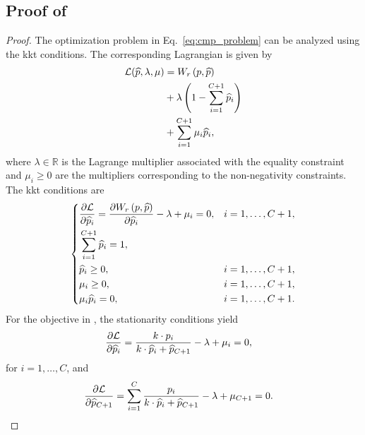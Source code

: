 \subsection{Proof of }
\label{sec:proof_kkt_conditions}
\theoremKKT*
\begin{proof}
    The optimization problem in Eq.~\eqref{eq:cmp_problem} can be analyzed using the \gls*{kkt} conditions. The corresponding Lagrangian is given by
    \begin{align*}
        \mathcal{L}(\phat, \lambda, \mu) & = \W{r} \\ & +\lambda\left(1-\sum_{i=1}^{C+1}\phat_i\right) \\ & +\sum_{i=1}^{C+1}\mu_i\phat_i,
    \end{align*}
    where $\lambda\in\mathbb{R}$ is the Lagrange multiplier associated with the equality constraint and $\mu_i\ge0$ are the multipliers corresponding to the non-negativity constraints.
    The \gls*{kkt} conditions are
    \begin{align*}
        \left\{
        \begin{aligned}
             & \frac{\partial \mathcal{L}}{\partial \phat_i}
            = \frac{\partial \W{r}}{\partial \phat_i}
            - \lambda + \mu_i = 0,
             &                                               & i=1,\ldots,C+1, \\
             & \sum_{i=1}^{C+1} \phat_i = 1,                                   \\
             & \phat_i                   \ge 0,
             &                                               & i=1,\ldots,C+1, \\
             & \mu_i                       \ge 0,
             &                                               & i=1,\ldots,C+1, \\
             & \mu_i \phat_i             = 0,
             &                                               & i=1,\ldots,C+1.
        \end{aligned}
        \right.
    \end{align*}
    For the objective in , the stationarity conditions yield
    \begin{align*}
        \frac{\partial\mathcal{L}}{\partial\widehat{p}_i} & = \frac{k\cdot p_i}{k\cdot\widehat{p}_i+\widehat{p}_{C+1}}-\lambda+\mu_i = 0,
    \end{align*}
    for \(i = 1, \ldots, C\), and
    \begin{align*}
        \frac{\partial\mathcal{L}}{\partial\phat_{C+1}} & = \sum_{i=1}^{C}\frac{p_i}{\costmult\cdot\phat_i+\phat_{C+1}}-\lambda+\mu_{C+1} = 0.

\end{align*}
\end{proof}
